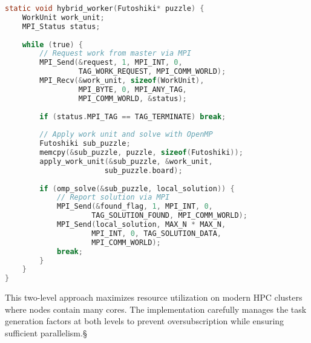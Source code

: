 \begin{lstlisting}[language=C, caption=Hybrid worker with nested parallelism]
static void hybrid_worker(Futoshiki* puzzle) {
    WorkUnit work_unit;
    MPI_Status status;
    
    while (true) {
        // Request work from master via MPI
        MPI_Send(&request, 1, MPI_INT, 0, 
                 TAG_WORK_REQUEST, MPI_COMM_WORLD);
        MPI_Recv(&work_unit, sizeof(WorkUnit), 
                 MPI_BYTE, 0, MPI_ANY_TAG, 
                 MPI_COMM_WORLD, &status);
        
        if (status.MPI_TAG == TAG_TERMINATE) break;
        
        // Apply work unit and solve with OpenMP
        Futoshiki sub_puzzle;
        memcpy(&sub_puzzle, puzzle, sizeof(Futoshiki));
        apply_work_unit(&sub_puzzle, &work_unit, 
                       sub_puzzle.board);
        
        if (omp_solve(&sub_puzzle, local_solution)) {
            // Report solution via MPI
            MPI_Send(&found_flag, 1, MPI_INT, 0, 
                    TAG_SOLUTION_FOUND, MPI_COMM_WORLD);
            MPI_Send(local_solution, MAX_N * MAX_N, 
                    MPI_INT, 0, TAG_SOLUTION_DATA, 
                    MPI_COMM_WORLD);
            break;
        }
    }
}
\end{lstlisting}

This two-level approach maximizes resource utilization on modern HPC clusters where nodes contain many cores. The implementation carefully manages the task generation factors at both levels to prevent oversubscription while ensuring sufficient parallelism.§